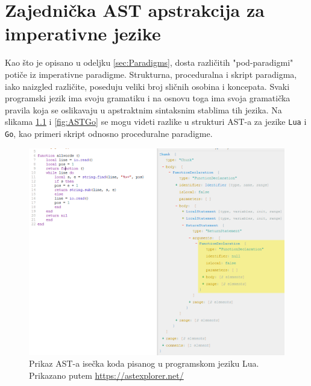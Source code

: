 \chapter{Zajednička AST apstrakcija za imperativne jezike}
\label{chp:MyAST}

Kao što je opisano u odeljku \ref{sec:Paradigms}, dosta različitih "pod-paradigmi" potiče iz imperativne paradigme. Strukturna, proceduralna i skript paradigma, iako naizgled različite, poseduju veliki broj sličnih osobina i koncepata. Svaki programski jezik ima svoju gramatiku i na osnovu toga ima svoja gramatička pravila koja se oslikavaju u apstraktnim sintaksnim stablima tih jezika. Na slikama \ref{fig:ASTLua} i \ref{fig:ASTGo} se mogu videti razlike u strukturi AST-a za jezike \texttt{Lua} i \texttt{Go}, kao primeri skript odnosno proceduralne paradigme.

\begin{figure}[h!]
    \centering
        \includegraphics[scale=0.6]{images/ast_lua.png}
    \caption{Prikaz AST-a isečka koda pisanog u programskom jeziku Lua. Prikazano putem \url{https://astexplorer.net/}}
    \label{fig:ASTLua}
\end{figure}

